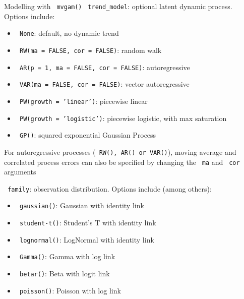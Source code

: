 \documentclass[final,9pt,fleqn]{beamer}\usepackage[]{graphicx}\usepackage[]{xcolor}
\begin{document}
\begin{frame}[fragile]
\begin{columns}
\begin{column}{0.3\paperwidth}
\begin{block}{{\fontsize{21}{21} \selectfont \color{BrickRed} Modelling with \texttt{\color{Orchid} mvgam()}}}
\medskip
\texttt{\color{Orchid} trend\_model}: optional latent dynamic process. Options include:
\begin{itemize}

\item\texttt{\color{Orchid} None}: default, no dynamic trend

\item\texttt{\color{Orchid} RW(ma = FALSE, cor = FALSE)}: random walk

\item\texttt{\color{Orchid} AR(p = 1, ma = FALSE, cor = FALSE)}: autoregressive

\item\texttt{\color{Orchid} VAR(ma = FALSE, cor = FALSE)}: vector autoregressive

\item\texttt{\color{Orchid} PW(growth = 'linear')}: piecewise linear

\item\texttt{\color{Orchid} PW(growth = 'logistic')}: piecewise logistic, with max saturation

\item\texttt{\color{Orchid} GP()}: squared exponential Gaussian Process
\end{itemize}
For autoregressive processes (\texttt{\color{Orchid} RW(), AR() or VAR()}), moving average and correlated process errors can also be specified by changing the \texttt{\color{Orchid} ma} and \texttt{\color{Orchid} cor} arguments

\medskip
\texttt{\color{Orchid} family}: observation distribution. Options include (among others):
\begin{itemize}

\item\texttt{\color{Orchid} gaussian()}: Gaussian with identity link

\item\texttt{\color{Orchid} student-t()}: Student's T with identity link

\item\texttt{\color{Orchid} lognormal()}: LogNormal with identity link

\item\texttt{\color{Orchid} Gamma()}: Gamma with log link

\item\texttt{\color{Orchid} betar()}: Beta with logit link

\item\texttt{\color{Orchid} poisson()}: Poisson with log link


\end{itemize}
\end{block}
\end{column}
\end{columns}
\end{frame}
\end{document}
